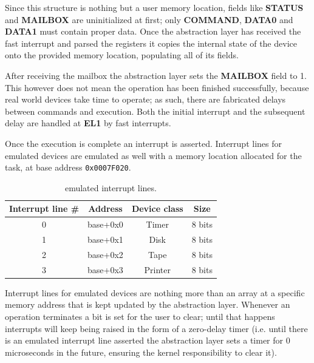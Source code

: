 \documentclass[12pt,a4paper,openright,twoside]{report}
\begin{document}
Since this structure is nothing but a user memory location, fields like \textbf{STATUS}
and \textbf{MAILBOX} are uninitialized at first; only \textbf{COMMAND}, \textbf{DATA0} and \textbf{DATA1}
must contain proper data. Once the abstraction layer has received the fast interrupt
and parsed the registers it copies the internal state of the device onto the
provided memory location, populating all of its fields.

After receiving the mailbox the abstraction layer sets the \textbf{MAILBOX} field
to 1. This however does not mean the operation has been finished successfully, because 
real world devices take time to operate; as such, there are fabricated delays between
commands and execution. Both the initial interrupt and the subsequent delay are 
handled at \textbf{EL1} by fast interrupts.

Once the execution is complete an interrupt is asserted. Interrupt lines for emulated
devices are emulated as well with a memory location allocated for the task, at 
base address {\tt 0x0007F020}.

\begin{table}[h]
\begin{center}
    \begin{tabular}{|c|c|c|c|}
    \hline
    \rowcolor[HTML]{C0C0C0} 
    Interrupt line \# & Address  & Device class & Size   \\ \hline
    0                 & base+0x0 & Timer        & 8 bits \\ \hline
    1                 & base+0x1 & Disk         & 8 bits \\ \hline
    2                 & base+0x2 & Tape         & 8 bits \\ \hline
    3                 & base+0x3 & Printer      & 8 bits \\ \hline
    \end{tabular}
 \caption[Emulated Interrupt Lines]{emulated interrupt lines.}\label{tab:reg}
\end{center}
\end{table}

Interrupt lines for emulated devices are nothing more than an array at a specific
memory address that is kept updated by the abstraction layer. Whenever an operation
terminates a bit is set for the user to clear; until that happens interrupts will
keep being raised in the form of a zero-delay timer (i.e. until there is an emulated
interrupt line asserted the abstraction layer sets a timer for 0 microseconds 
in the future, ensuring the kernel responsibility to clear it).\\
\end{document}

